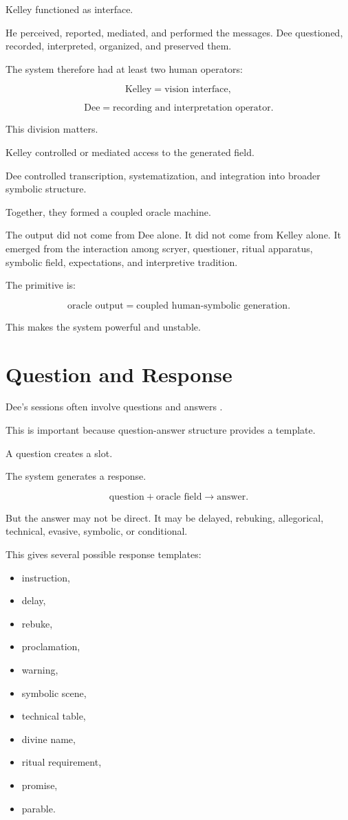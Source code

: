 \documentclass[11pt]{book}
\begin{document}
Kelley functioned as interface.

He perceived, reported, mediated, and performed the messages. Dee questioned, recorded, interpreted, organized, and preserved them.

The system therefore had at least two human operators:

\[
\text{Kelley} = \text{vision interface},
\]

\[
\text{Dee} = \text{recording and interpretation operator}.
\]

This division matters.

Kelley controlled or mediated access to the generated field.

Dee controlled transcription, systematization, and integration into broader symbolic structure.

Together, they formed a coupled oracle machine.

The output did not come from Dee alone. It did not come from Kelley alone. It emerged from the interaction among scryer, questioner, ritual apparatus, symbolic field, expectations, and interpretive tradition.

The primitive is:

\[
\text{oracle output} = \text{coupled human-symbolic generation}.
\]

This makes the system powerful and unstable.

\section{Question and Response}

Dee’s sessions often involve questions and answers \cite{DeeCasaubon1659TrueFaithfulRelation}.

This is important because question-answer structure provides a template.

A question creates a slot.

The system generates a response.

\[
\text{question}
+
\text{oracle field}
\rightarrow
\text{answer}.
\]

But the answer may not be direct. It may be delayed, rebuking, allegorical, technical, evasive, symbolic, or conditional.

This gives several possible response templates:

\begin{itemize}
    \item instruction,
    \item delay,
    \item rebuke,
    \item proclamation,
    \item warning,
    \item symbolic scene,
    \item technical table,
    \item divine name,
    \item ritual requirement,
    \item promise,
    \item parable.
\end{itemize}
\end{document}
